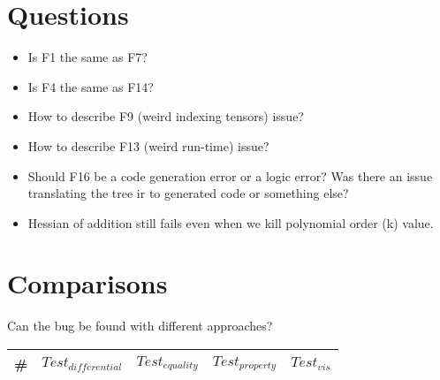 \documentclass{article}
\newcommand{\testA}[0]{$\textit{Test}_{differential}$}
\newcommand{\testB}[0]{$\textit{Test}_{equality}$}
\newcommand{\testC}[0]{$\textit{Test}_{property}$}
\newcommand{\testD}[0]{$\textit{Test}_{vis}$}
\begin{document}
\section{Questions}
\begin{itemize}[noitemsep]
\item Is F1 the same as F7?
\item  Is F4 the same as F14?  
\item How to describe F9 (weird indexing tensors) issue?
\item How to describe F13 (weird run-time) issue?
\item Should F16 be a code generation error or a logic error? Was there an issue translating the tree ir to generated code or something else?
\item Hessian of addition still fails even when we kill polynomial order (k) value.
\end{itemize}



\section{Comparisons}
Can the bug be found with different approaches?\\
\begin{tabular}{|l|llll|}
\hline
\# & \testA{} & \testB{} & \testC{} & \testD{}\\
\hline
\end{tabular}




\end{document}
